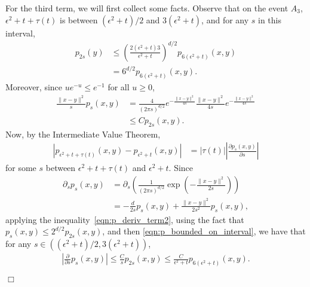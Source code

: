 \documentclass[12pt]{article}
\newenvironment {proof}{{\noindent\bf Proof }}{\hfill $\Box$ \medskip}
\numberwithin{equation}{section}
\begin{document}
\begin{proof}
    For the third term, we will first collect some facts.
    Observe that on the event $A_3$,
    $\epsilon^2 + t + \tau(t)$ is between
    $(\epsilon^2 + t)/ 2$ and $3(\epsilon^2 + t)$,
    and for any $s$ in this interval,
    \begin{align}
        p_{2s}(y)
        &\le \nonumber
        \left( \frac{
            2 (\epsilon^2 + t)3
        }{
            \epsilon^2 + t
        } \right)^{d/2}
        p_{6(\epsilon^2 + t)}(x, y)
        \\ &= \label{eqn:p_bounded_on_interval}
        6^{d/2}
        p_{6(\epsilon^2 + t)}(x, y) .
    \end{align}
    Moreover, since $u e^{-u} \le e^{-1}$ for all $u \ge 0$,
    \begin{align}
        \frac{\|x - y\|^2}{s} p_s(x, y)
        &= \nonumber
        \frac{4}{(2 \pi s)^{d/2}}
        e^{- \frac{ \|x-y\|^2 }{ 4s }}
        \frac{\|x-y\|^2}{4s}
        e^{- \frac{ \|x-y\|^2 }{ 4s }}
        \\ &\le \label{eqn:p_deriv_term2}
        C p_{2s}(x, y) .
    \end{align}
    Now, by the Intermediate Value Theorem,
    \begin{align}
\label{deduction from IVT}
        \left|
            p_{\epsilon^2 + t + \tau(t)}(x, y)
            -
            p_{\epsilon^2 + t}(x, y)
        \right|
        &=
        \left| \tau(t) \right|
        \left| \frac{\partial p_s(x, y)}{\partial s} \right|
    \end{align}
    for some $s$ between $\epsilon^2 + t + \tau(t)$ and $\epsilon^2 + t$.
   Since 
    \begin{align*}
        \partial_ s p_s(x, y)
        &=
        \partial_s
        \left(
            \frac{1}{(2 \pi s)^{d/2}}
            \exp\left( - \frac{\|x - y\|^2}{2 s} \right)
        \right)
        \\ &=
        - \frac{d}{2s} p_s(x, y) + \frac{\|x - y\|^2}{2 s^2} p_s(x, y),
    \end{align*}
    applying the inequality~\eqref{eqn:p_deriv_term2},
    using the fact that $p_s(x, y) \le 2^{d/2} p_{2s}(x,y)$,
    and then \eqref{eqn:p_bounded_on_interval},
    we have that for any $s \in ((\epsilon^2 + t)/ 2, 3(\epsilon^2 + t))$,
    \begin{align*}
        \left| \frac{\partial}{\partial s} p_s(x, y) \right|
        \le
        \frac{C}{s} p_{2s}(x, y) 
        \le
        \frac{C}{\epsilon^2 + t} p_{6(\epsilon^2 + t)}(x, y) .
    \end{align*}

\end{proof}
\end{document}
